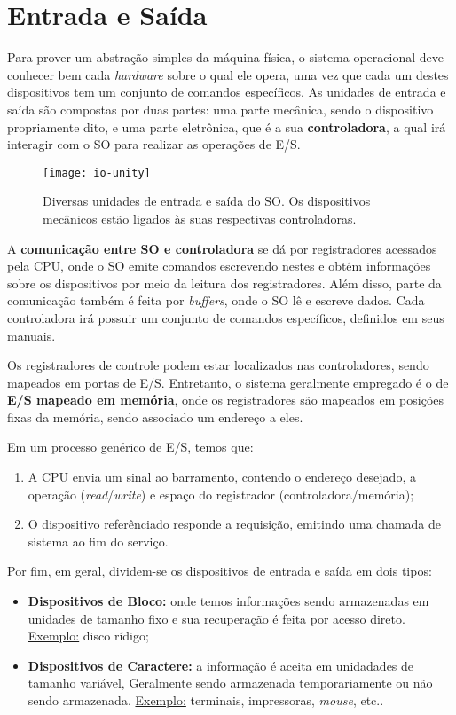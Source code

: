 \chapter{Entrada e Saída}

Para prover um abstração simples da máquina física, o sistema operacional deve conhecer bem cada \textit{hardware} sobre o qual ele opera, uma vez que cada um destes dispositivos tem um conjunto de comandos específicos. As unidades de entrada e saída são compostas por duas partes: uma parte mecânica, sendo o dispositivo propriamente dito, e uma parte eletrônica, que é a sua \textbf{controladora}, a qual irá interagir com o SO para realizar as operações de E/S.

\begin{figure}[H]
  \centering
  \texttt{[image: io-unity]}
  \caption{Diversas unidades de entrada e saída do SO. Os dispositivos mecânicos estão ligados às suas respectivas controladoras.}
  \label{fig:io-unity}
\end{figure}

A \textbf{comunicação entre SO e controladora} se dá por registradores acessados pela CPU, onde o SO emite comandos escrevendo nestes e obtém informações sobre os dispositivos por meio da leitura dos registradores. Além disso, parte da comunicação também é feita por \textit{buffers}, onde o SO lê e escreve dados. Cada controladora irá possuir um conjunto de comandos específicos, definidos em seus manuais.

Os registradores de controle podem estar localizados nas controladores, sendo mapeados em portas de E/S. Entretanto, o sistema geralmente empregado é o de \textbf{E/S mapeado em memória}, onde os registradores são mapeados em posições fixas da memória, sendo associado um endereço a eles.

Em um processo genérico de E/S, temos que:
\begin{enumerate}
  \item A CPU envia um sinal ao barramento, contendo o endereço desejado, a operação (\textit{read}/\textit{write}) e espaço do registrador (controladora/memória);

  \item O dispositivo referênciado responde a requisição, emitindo uma chamada de sistema ao fim do serviço.
\end{enumerate}

Por fim, em geral, dividem-se os dispositivos de entrada e saída em dois tipos:
\begin{itemize}
  \item \textbf{Dispositivos de Bloco:} onde temos informações sendo armazenadas em unidades de tamanho fixo e sua recuperação é feita por acesso direto. \underline{Exemplo:} disco rídigo;

  \item \textbf{Dispositivos de Caractere:} a informação é aceita em unidadades de tamanho variável, Geralmente sendo armazenada temporariamente ou não sendo armazenada. \underline{Exemplo:} terminais, impressoras, \textit{mouse}, etc..
\end{itemize}





